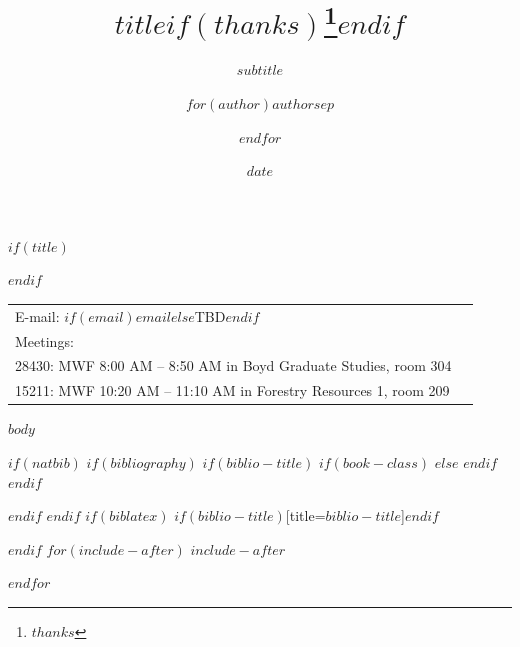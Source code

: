 \documentclass[$if(fontsize)$$fontsize$,$endif$$if(lang)$$babel-lang$,$endif$$if(papersize)$$papersize$,$endif$$for(classoption)$$classoption$$sep$,$endfor$]{article}
\title{$title$$if(thanks)$\thanks{$thanks$}$endif$}
\subtitle{$subtitle$}
\author{$for(author)$$author$$sep$ \and $endfor$}
\date{$date$}
\theoremstyle{warning}
\begin{document}
  

	$if(title)$
	\maketitle
	$endif$
	
	
		\thispagestyle{firststyle}



	\noindent \begin{tabular*}{\textwidth}{ @{\extracolsep{\fill}} lr @{\extracolsep{\fill}}}

  E-mail: $if(email)$\texttt{$email$}$else$TBD$endif$ &  \\
  \vspace{0.2em}
  Meetings: & \\
  \hspace{1em} 28430: MWF 8:00 AM -- 8:50 AM in Boyd Graduate Studies, room 304 \\
  \hspace{1em} 15211: MWF 10:20 AM -- 11:10 AM in Forestry Resources 1, room 209 
  &  \\
  \hline
	\end{tabular*}
	

\tableofcontents

\newpage


$body$




$if(natbib)$
$if(bibliography)$
$if(biblio-title)$
$if(book-class)$
\renewcommand\bibname{$biblio-title$}
$else$
\renewcommand\refname{$biblio-title$}
$endif$
$endif$


$endif$
$endif$
$if(biblatex)$
\printbibliography$if(biblio-title)$[title=$biblio-title$]$endif$




$endif$
$for(include-after)$
$include-after$

$endfor$
\end{document}
